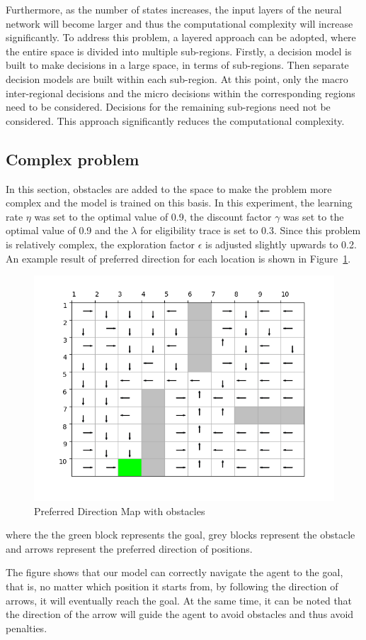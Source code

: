 \documentclass[conference]{IEEEtran}
\begin{document}
Furthermore, as the number of states increases, the input layers of the neural network will become larger and thus the computational complexity will increase significantly. To address this problem, a layered approach can be adopted, where the entire space is divided into multiple sub-regions. Firstly, a decision model is built to make decisions in a large space, in terms of sub-regions. Then separate decision models are built within each sub-region. At this point, only the macro inter-regional decisions and the micro decisions within the corresponding regions need to be considered. Decisions for the remaining sub-regions need not be considered. This approach significantly reduces the computational complexity.

\subsection{Complex problem}

In this section, obstacles are added to the space to make the problem more complex and the model is trained on this basis. In this experiment, the learning rate \({\eta}\) was set to the optimal value of 0.9, the discount factor \({\gamma}\) was set to the optimal value of 0.9 and the \({\lambda}\) for eligibility trace is set to 0.3. Since this problem is relatively complex, the exploration factor \({\epsilon}\) is adjusted slightly upwards to 0.2. An example result of preferred direction for each location is shown in Figure~\ref{fig:complex}.

\begin{figure}[!ht]
    \centering
    \includegraphics[width=.45\textwidth]{figures/complex_direc/5.png}
    \caption{Preferred Direction Map with obstacles}\label{fig:complex}
\end{figure}
where the the green block represents the goal, grey blocks represent the obstacle and arrows represent the preferred direction of positions.

The figure shows that our model can correctly navigate the agent to the goal, that is, no matter which position it starts from, by following the direction of arrows, it will eventually reach the goal. At the same time, it can be noted that the direction of the arrow will guide the agent to avoid obstacles and thus avoid penalties.
\end{document}
